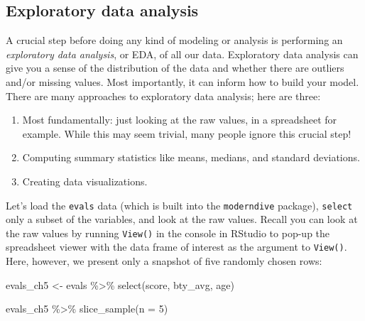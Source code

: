 \documentclass[
  letterpaper,
  DIV=11,
  numbers=noendperiod]{scrreprt}
\newenvironment{Shaded}{\begin{snugshade}}{\end{snugshade}}
\newcommand{\AttributeTok}[1]{\textcolor[rgb]{0.40,0.45,0.13}{#1}}
\newcommand{\DecValTok}[1]{\textcolor[rgb]{0.68,0.00,0.00}{#1}}
\newcommand{\FunctionTok}[1]{\textcolor[rgb]{0.28,0.35,0.67}{#1}}
\newcommand{\NormalTok}[1]{\textcolor[rgb]{0.00,0.23,0.31}{#1}}
\newcommand{\OtherTok}[1]{\textcolor[rgb]{0.00,0.23,0.31}{#1}}
\newcommand{\SpecialCharTok}[1]{\textcolor[rgb]{0.37,0.37,0.37}{#1}}
\theoremstyle{definition}
\theoremstyle{remark}
\begin{document}
\hypertarget{sec-model1EDA}{%
\subsection{Exploratory data analysis}\label{sec-model1EDA}}

A crucial step before doing any kind of modeling or analysis is
performing an \emph{exploratory data analysis}, or EDA, of all our data.
Exploratory data analysis can give you a sense of the distribution of
the data and whether there are outliers and/or missing values. Most
importantly, it can inform how to build your model. There are many
approaches to exploratory data analysis; here are three:

\begin{enumerate}
\def\labelenumi{\arabic{enumi}.}
\item
  Most fundamentally: just looking at the raw values, in a spreadsheet
  for example. While this may seem trivial, many people ignore this
  crucial step!
\item
  Computing summary statistics like means, medians, and standard
  deviations.
\item
  Creating data visualizations.
\end{enumerate}

Let's load the \texttt{evals} data (which is built into the
\texttt{moderndive} package), \texttt{select} only a subset of the
variables, and look at the raw values. Recall you can look at the raw
values by running \texttt{View()} in the console in RStudio to pop-up
the spreadsheet viewer with the data frame of interest as the argument
to \texttt{View()}. Here, however, we present only a snapshot of five
randomly chosen rows:

\begin{Shaded}
\begin{Highlighting}[]
\NormalTok{evals\_ch5 }\OtherTok{\textless{}{-}}\NormalTok{ evals }\SpecialCharTok{\%\textgreater{}\%}
  \FunctionTok{select}\NormalTok{(score, bty\_avg, age)}
\end{Highlighting}
\end{Shaded}

\begin{Shaded}
\begin{Highlighting}[]
\NormalTok{evals\_ch5 }\SpecialCharTok{\%\textgreater{}\%} 
  \FunctionTok{slice\_sample}\NormalTok{(}\AttributeTok{n =} \DecValTok{5}\NormalTok{)}
\end{Highlighting}
\end{Shaded}
\end{document}
